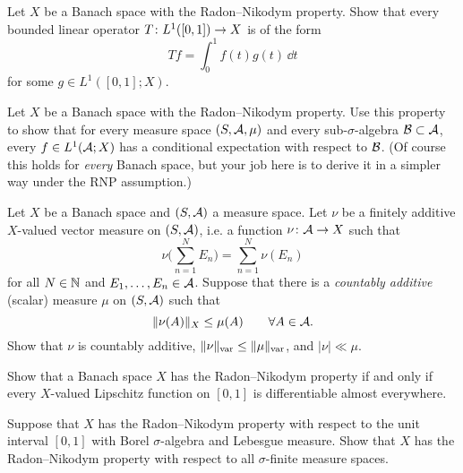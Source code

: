 \begin{exercise}
  Let $X$ be a Banach space with the Radon--Nikodym property.
  Show that every bounded linear operator $T \colon L^1([0,1]) \rightarrow X$ is of the form
  \begin{equation*}
    Tf = \int_0^1 f(t) g(t) \, \dd t
  \end{equation*}
  for some $g \in L^1([0,1];X)$.
\end{exercise}

\begin{exercise}
  Let $X$ be a Banach space with the Radon--Nikodym property.
  Use this property to show that for every measure space $(S,\mathcal{A},\mu)$ and every sub-$\sigma$-algebra $\mathcal{B} \subset \mathcal{A}$, every $f \in L^1(\mathcal{A};X)$ has a conditional expectation with respect to $\mathcal{B}$.
  (Of course this holds for \emph{every} Banach space, but your job here is to derive it in a simpler way under the RNP assumption.)
\end{exercise}

\begin{exercise}\label{ex:fa-meas-ca}
  Let $X$ be a Banach space and $(S,\mathcal{A})$ a measure space.
  Let $\nu$ be a finitely additive $X$-valued vector measure on $(S,\mathcal{A})$, i.e. a function $\nu \colon \mathcal{A} \rightarrow X$ such that
  \begin{equation*}
    \nu\Big(\sum_{n=1}^{N} E_n\Big) = \sum_{n=1}^{N} \nu(E_n)
  \end{equation*}
  for all $N \in \mathbb{N}$ and $E_1,\ldots,E_n \in \mathcal{A}$.
  Suppose that there is a \emph{countably additive} (scalar) measure $\mu$ on $(S,\mathcal{A})$ such that
  \begin{equation*}
    \|\nu(A)\|_{X} \leq \mu(A) \qquad \forall A \in \mathcal{A}.
  \end{equation*}
  Show that $\nu$ is countably additive, $\|\nu\|_{\mathrm{var}} \leq \|\mu\|_{\mathrm{var}}$, and $|\nu| \ll \mu$.
\end{exercise}

\begin{exercise}
  Show that a Banach space $X$ has the Radon--Nikodym property if and only if every $X$-valued Lipschitz function on $[0,1]$ is differentiable almost everywhere.
\end{exercise}

\begin{exercise}\label{ex:RNP-unitinterval}
  Suppose that $X$ has the Radon--Nikodym property with respect to the unit interval $[0,1]$ with Borel $\sigma$-algebra and Lebesgue measure.
  Show that $X$ has the Radon--Nikodym property with respect to all $\sigma$-finite measure spaces.
\end{exercise}


